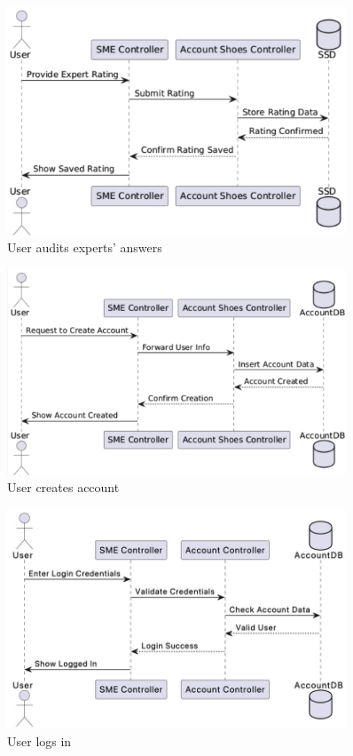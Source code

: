\documentclass[]{article}
\begin{document}
\begin{figure}[H]
    \centering
    \includegraphics[width=0.9\textwidth]{S3/image (4).png}
	\caption{User audits experts’ answers}
\end{figure}

\begin{figure}[H]
    \centering
    \includegraphics[width=0.9\textwidth]{S3/image (5).png}
	\caption{User creates account}
\end{figure}

\begin{figure}[H]
    \centering
    \includegraphics[width=0.9\textwidth]{S3/image (6).jpeg}
	\caption{User logs in}
\end{figure}
\end{document}
